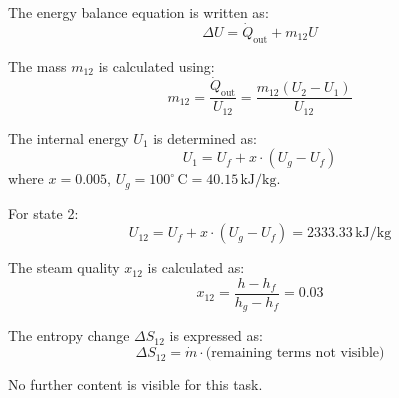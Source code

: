 The energy balance equation is written as:  
\[
\Delta U = \dot{Q}_{\text{out}} + m_{12} U
\]  

The mass \( m_{12} \) is calculated using:  
\[
m_{12} = \frac{\dot{Q}_{\text{out}}}{U_{12}} = \frac{m_{12} (U_2 - U_1)}{U_{12}}
\]  

The internal energy \( U_1 \) is determined as:  
\[
U_1 = U_f + x \cdot (U_g - U_f)
\]  
where \( x = 0.005 \), \( U_g = 100^\circ \, \text{C} = 40.15 \, \text{kJ/kg} \).  

For state 2:  
\[
U_{12} = U_f + x \cdot (U_g - U_f) = 2333.33 \, \text{kJ/kg}
\]  

The steam quality \( x_{12} \) is calculated as:  
\[
x_{12} = \frac{h - h_f}{h_g - h_f} = 0.03
\]  

The entropy change \( \Delta S_{12} \) is expressed as:  
\[
\Delta S_{12} = \dot{m} \cdot \text{(remaining terms not visible)}
\]  

No further content is visible for this task.